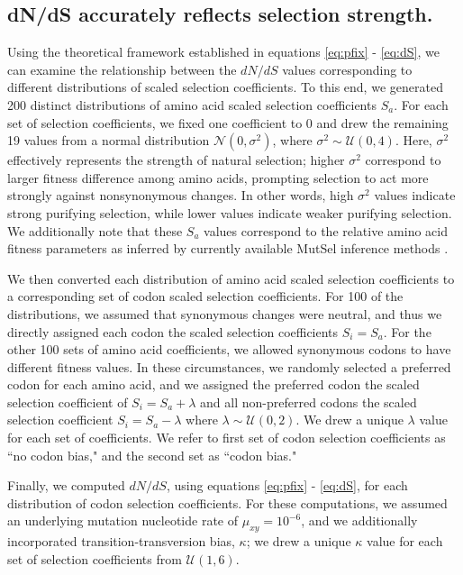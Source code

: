\documentclass{pnastwo}
\begin{document}
\begin{article}
				
\subsection*{dN/dS accurately reflects selection strength.}

Using the theoretical framework established in equations \eqref{eq:pfix} - \eqref{eq:dS}, we can examine the relationship between the $dN/dS$ values corresponding to different distributions of scaled selection coefficients. To this end, we generated 200 distinct distributions of amino acid scaled selection coefficients $S_a$. For each set of selection coefficients, we fixed one coefficient to 0 and drew the remaining 19 values from a normal distribution $\mathcal{N}(0,\sigma^2)$, where $\sigma^2 \sim \mathcal{U}(0,4)$. Here, $\sigma^2$ effectively represents the strength of natural selection; higher $\sigma^2$ correspond to larger fitness difference among amino acids, prompting selection to act more strongly against nonsynonymous changes. In other words, high $\sigma^2$ values indicate strong purifying selection, while lower values indicate weaker purifying selection. We additionally note that these $S_a$ values correspond to the relative amino acid fitness parameters as inferred by currently available MutSel inference methods \cite{Tamurietal2014,RodrigueLartillot2014}. 

We then converted each distribution of amino acid scaled selection coefficients to a corresponding set of codon scaled selection coefficients. For 100 of the distributions, we assumed that synonymous changes were neutral, and thus we directly assigned each codon the scaled selection coefficients $S_i = S_a$. For the other 100 sets of amino acid coefficients, we allowed synonymous codons to have different fitness values. In these circumstances, we randomly selected a preferred codon for each amino acid, and we assigned the preferred codon the scaled selection coefficient of $S_i = S_a + \lambda$ and all non-preferred codons the scaled selection coefficient $S_i = S_a - \lambda$ where $\lambda \sim \mathcal{U}(0,2)$. We drew a unique $\lambda$ value for each set of coefficients. We refer to first set of codon selection coefficients as ``no codon bias," and the second set as ``codon bias."

Finally, we computed $dN/dS$, using equations \eqref{eq:pfix} - \eqref{eq:dS}, for each distribution of codon selection coefficients. For these computations, we assumed an underlying mutation nucleotide rate of $\mu_{xy} = 10^{-6}$, and we additionally incorporated transition-transversion bias, $\kappa$; we drew a unique $\kappa$ value for each set of selection coefficients from $\mathcal{U}(1,6)$.


\end{article}
\end{document}
